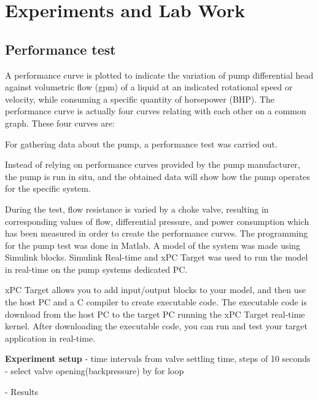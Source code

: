 \chapter{Experiments and Lab Work}\label{ch:experiment} 
\section{Performance test}\label{sec:performance_test} 


A performance curve is plotted to indicate the variation of pump differential head against volumetric flow (gpm) of a liquid at an indicated rotational speed or velocity, while consuming a specific quantity of horsepower (BHP). The performance curve is actually four curves relating with each other on a common graph. These four curves are:

For gathering data about the pump, a performance test was carried out.

Instead of relying on performance curves provided by the pump manufacturer,
the pump is run in situ, and the obtained data will show how the pump operates for the specific system.

During the test, flow resistance is varied by a choke valve, resulting in 
corresponding values of flow, differential pressure, and power consumption 
which has been measured in order to create the performance curves.
\newline
\newline
The programming for the pump test was done in Matlab. 
A model of the system was made using Simulink blocks. 
Simulink Real-time and xPC Target was used to run the model in real-time 
on the pump systems dedicated PC. 


xPC Target allows you to add input/output blocks to your model, and then use the host 
PC and a C compiler to create executable code. The executable code is download 
from the host PC to the target PC running the xPC Target real-time kernel. 
After downloading the executable code, you can run and test your target 
application in real-time. 


\textbf{Experiment setup}
- time intervals from valve settling time, steps of 10 seconds
- select valve opening(backpressure) by for loop


- Results
 